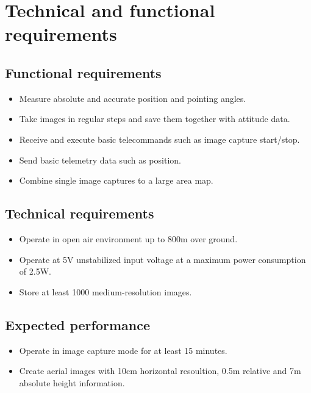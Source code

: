\documentclass[fontsize=11pt,paper=a4,]{scrartcl}
\begin{document}
\section{Technical and functional requirements}
\subsection{Functional requirements}
\begin{itemize}
\item Measure absolute and accurate position and pointing angles.
\item Take images in regular steps and save them together with attitude data.
\item Receive and execute basic telecommands such as image capture start/stop.
\item Send basic telemetry data such as position.
\item Combine single image captures to a large area map.
\end{itemize}


\subsection{Technical requirements}
\begin{itemize}
\item Operate in open air environment up to 800m over ground.
\item Operate at 5V unstabilized input voltage at a maximum power consumption of 2.5W.
\item Store at least 1000 medium-resolution images.
\end{itemize}


\subsection{Expected performance}
\begin{itemize}
\item Operate in image capture mode for at least 15 minutes.
\item Create aerial images with 10cm horizontal resoultion, 0.5m relative and 7m absolute height information.
\end{itemize}
\end{document}
